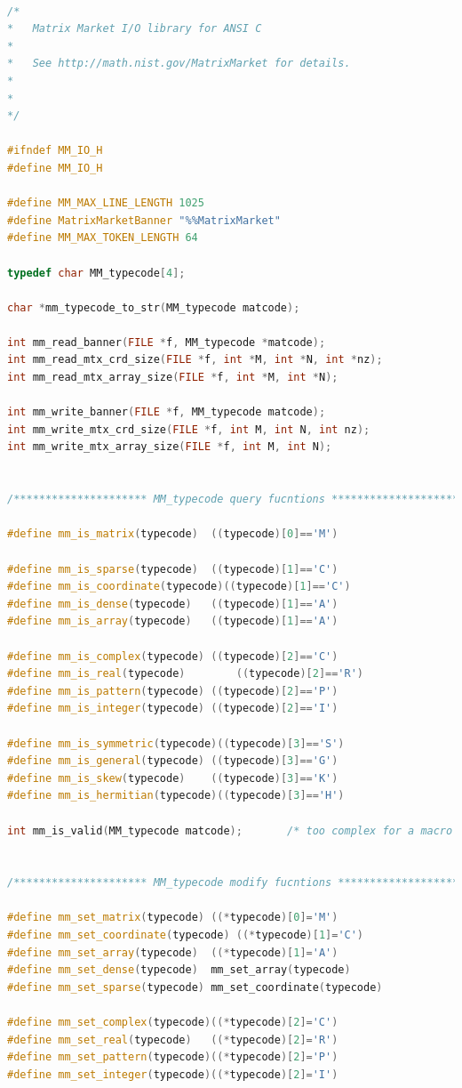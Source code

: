 \documentclass{scrreprt}
\begin{document}
\begin{lstlisting}[language=C++, caption=mmio.h]

/* 
*   Matrix Market I/O library for ANSI C
*
*   See http://math.nist.gov/MatrixMarket for details.
*
*
*/

#ifndef MM_IO_H
#define MM_IO_H

#define MM_MAX_LINE_LENGTH 1025
#define MatrixMarketBanner "%%MatrixMarket"
#define MM_MAX_TOKEN_LENGTH 64

typedef char MM_typecode[4];

char *mm_typecode_to_str(MM_typecode matcode);

int mm_read_banner(FILE *f, MM_typecode *matcode);
int mm_read_mtx_crd_size(FILE *f, int *M, int *N, int *nz);
int mm_read_mtx_array_size(FILE *f, int *M, int *N);

int mm_write_banner(FILE *f, MM_typecode matcode);
int mm_write_mtx_crd_size(FILE *f, int M, int N, int nz);
int mm_write_mtx_array_size(FILE *f, int M, int N);


/********************* MM_typecode query fucntions ***************************/

#define mm_is_matrix(typecode)	((typecode)[0]=='M')

#define mm_is_sparse(typecode)	((typecode)[1]=='C')
#define mm_is_coordinate(typecode)((typecode)[1]=='C')
#define mm_is_dense(typecode)	((typecode)[1]=='A')
#define mm_is_array(typecode)	((typecode)[1]=='A')

#define mm_is_complex(typecode)	((typecode)[2]=='C')
#define mm_is_real(typecode)		((typecode)[2]=='R')
#define mm_is_pattern(typecode)	((typecode)[2]=='P')
#define mm_is_integer(typecode) ((typecode)[2]=='I')

#define mm_is_symmetric(typecode)((typecode)[3]=='S')
#define mm_is_general(typecode)	((typecode)[3]=='G')
#define mm_is_skew(typecode)	((typecode)[3]=='K')
#define mm_is_hermitian(typecode)((typecode)[3]=='H')

int mm_is_valid(MM_typecode matcode);		/* too complex for a macro */


/********************* MM_typecode modify fucntions ***************************/

#define mm_set_matrix(typecode)	((*typecode)[0]='M')
#define mm_set_coordinate(typecode)	((*typecode)[1]='C')
#define mm_set_array(typecode)	((*typecode)[1]='A')
#define mm_set_dense(typecode)	mm_set_array(typecode)
#define mm_set_sparse(typecode)	mm_set_coordinate(typecode)

#define mm_set_complex(typecode)((*typecode)[2]='C')
#define mm_set_real(typecode)	((*typecode)[2]='R')
#define mm_set_pattern(typecode)((*typecode)[2]='P')
#define mm_set_integer(typecode)((*typecode)[2]='I')



\end{lstlisting}
\end{document}
